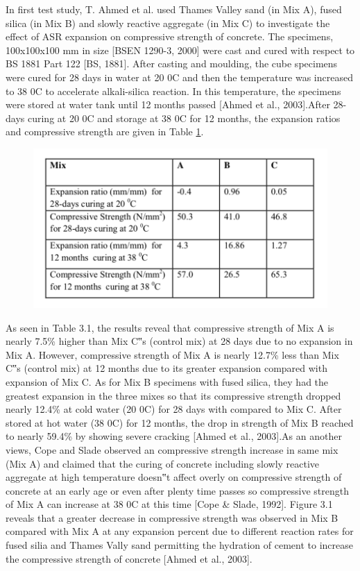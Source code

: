 In first test study, T. Ahmed et al. used Thames Valley sand (in Mix A), fused silica (in Mix B) and slowly reactive aggregate (in Mix C) to investigate the effect of ASR expansion on compressive strength of concrete. The specimens, 100x100x100 mm in size [BSEN 1290-3, 2000] were cast and cured with respect to BS 1881 Part 122 [BS, 1881]. After casting and moulding, the cube specimens were cured for 28 days in water at 20 0C and then the temperature was increased to 38 0C to accelerate alkali-silica reaction. In this temperature, the specimens were stored at water tank until 12 months passed [Ahmed et al., 2003].After 28-days curing at 20 0C and storage at 38 0C for 12 months, the expansion ratios and compressive strength are given in Table \ref{}.


\begin{figure}
  \includegraphics{Reference/temp1.png}
  \caption{}
  \label{}
\end{figure}

As seen in Table 3.1, the results reveal that compressive strength of Mix A is nearly 7.5\% higher than Mix C‟s (control mix) at 28 days due to no expansion in Mix A. However, compressive strength of Mix A is nearly 12.7\% less than Mix C‟s (control mix) at 12 months due to its greater expansion compared with expansion of Mix C. As for Mix B specimens with fused silica, they had the greatest expansion in the three mixes so that its compressive strength dropped nearly 12.4\% at cold water (20 0C) for 28 days with compared to Mix C. After stored at hot water (38 0C) for 12 months, the drop in strength of Mix B reached to nearly 59.4\% by showing severe cracking [Ahmed et al., 2003].As an another views, Cope and Slade observed an compressive strength increase in same mix (Mix A) and claimed that the curing of concrete including slowly reactive aggregate at high temperature doesn‟t affect overly on compressive strength of concrete at an early age or even after plenty time passes so compressive strength of Mix A can increase at 38 0C at this time [Cope & Slade, 1992]. Figure 3.1 reveals that a greater decrease in compressive strength was observed in Mix B compared with Mix A at any expansion percent due to different reaction rates for fused silia and Thames Vally sand permitting the hydration of cement to increase the compressive strength of concrete [Ahmed et al., 2003].

 
